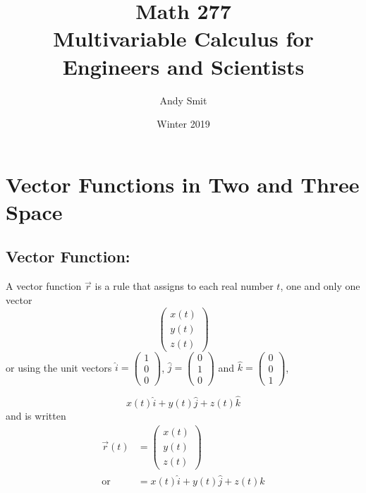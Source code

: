 \documentclass[14pt]{article}
\title{Math 277\\Multivariable Calculus for Engineers and Scientists}
\author{Andy Smit}
\date{Winter 2019}
\begin{document}
    \maketitle
    \section{Vector Functions in Two and Three Space}
    \subsection{Vector Function: }
    A vector function $\vec{r}$ is a rule that assigns to each real
    number $t$, one and only one vector 
    $$\begin{pmatrix}x(t)\\  y(t)\\ z(t)\end{pmatrix}$$ or using the
    unit vectors
    $\hat{i}=\left(\begin{smallmatrix}1\\0\\0\end{smallmatrix}\right)$,
    $\hat{j}=\left(\begin{smallmatrix}0\\1\\0\end{smallmatrix}\right)$
    and
    $\hat{k}=\left(\begin{smallmatrix}0\\0\\1\end{smallmatrix}\right)$,
    
    $$x(t)\hat{i}+y(t)\hat{j}+z(t)\hat{k}$$ and is written 
    \[
        \begin{split}
            \vec{r}(t) &= \begin{pmatrix}x(t)\\y(t)\\z(t)\end{pmatrix}\\ 
            \text{or\ } &= x(t)\hat{i}+y(t)\hat{j}+z(t)\hat{k}
        \end{split}
    \]
\end{document}
